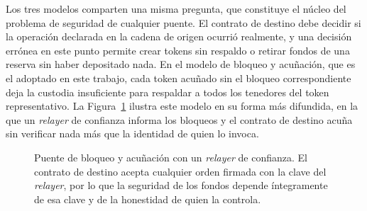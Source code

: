 Los tres modelos comparten una misma pregunta, que constituye el núcleo del problema de seguridad
de cualquier puente. El contrato de destino debe decidir si la operación declarada en la cadena
de origen ocurrió realmente, y una decisión errónea en este punto permite crear tokens sin
respaldo o retirar fondos de una reserva sin haber depositado nada. En el modelo de bloqueo y
acuñación, que es el adoptado en este trabajo, cada token acuñado sin el bloqueo correspondiente
deja la custodia insuficiente para respaldar a todos los tenedores del token representativo. La
Figura~\ref{fig:puente_confianza} ilustra este modelo en su forma más difundida, en la que un
\textit{relayer} de confianza informa los bloqueos y el contrato de destino acuña sin verificar
nada más que la identidad de quien lo invoca.

\begin{figure}[htbp]
	\centering
	\caption[Puente de bloqueo y acuñación con un \textit{relayer} de confianza.]{Puente de bloqueo
	y acuñación con un \textit{relayer} de confianza. El contrato de destino acepta cualquier orden
	firmada con la clave del \textit{relayer}, por lo que la seguridad de los fondos depende
	íntegramente de esa clave y de la honestidad de quien la controla.}
	\label{fig:puente_confianza}
\end{figure}

